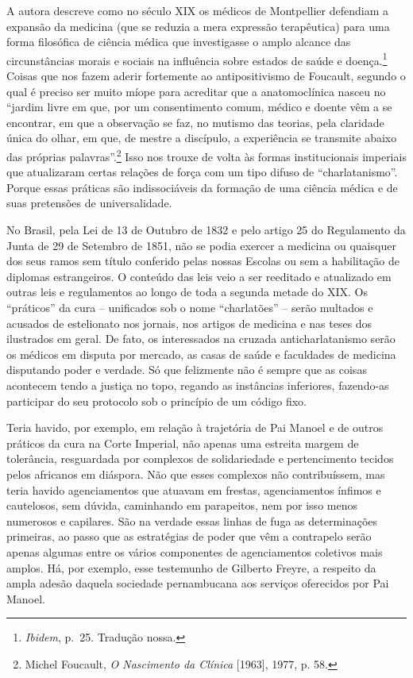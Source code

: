 A autora descreve como no século XIX os médicos de Montpellier defendiam
a expansão da medicina (que se reduzia a mera expressão terapêutica)
para uma forma filosófica de ciência médica que investigasse o amplo
alcance das circunstâncias morais e sociais na influência sobre estados
de saúde e doença.\footnote{\emph{Ibidem}, p.~25. Tradução nossa.}
Coisas que nos fazem aderir fortemente ao antipositivismo de Foucault,
segundo o qual é preciso ser muito míope para acreditar que a
anatomoclínica nasceu no ``jardim livre em que, por um consentimento
comum, médico e doente vêm a se encontrar, em que a observação se faz,
no mutismo das teorias, pela claridade única do olhar, em que, de mestre
a discípulo, a experiência se transmite abaixo das próprias
palavras''.\footnote{Michel Foucault, \emph{O Nascimento da Clínica}
  {[}1963{]}, 1977, p. 58.} Isso nos trouxe de volta às formas
institucionais imperiais que atualizaram certas relações de força com um
tipo difuso de ``charlatanismo''. Porque essas práticas são
indissociáveis da formação de uma ciência médica e de suas pretensões de
universalidade.

No Brasil, pela Lei de 13 de Outubro de 1832 e pelo artigo 25 do
Regulamento da Junta de 29 de Setembro de 1851, não se podia exercer a
medicina ou quaisquer dos seus ramos sem título conferido pelas nossas
Escolas ou sem a habilitação de diplomas estrangeiros. O conteúdo das
leis veio a ser reeditado e atualizado em outras leis e regulamentos ao
longo de toda a segunda metade do XIX. Os ``práticos'' da cura --
unificados sob o nome ``charlatões'' -- serão multados e acusados de
estelionato nos jornais, nos artigos de medicina e nas teses dos
ilustrados em geral. De fato, os interessados na cruzada
anticharlatanismo serão os médicos em disputa por mercado, as casas de
saúde e faculdades de medicina disputando poder e verdade. Só que
felizmente não é sempre que as coisas acontecem tendo a justiça no topo,
regando as instâncias inferiores, fazendo-as participar do seu protocolo
sob o princípio de um código fixo.

Teria havido, por exemplo, em relação à trajetória de Pai Manoel e de
outros práticos da cura na Corte Imperial, não apenas uma estreita
margem de tolerância, resguardada por complexos de solidariedade e
pertencimento tecidos pelos africanos em diáspora. Não que esses
complexos não contribuíssem, mas teria havido agenciamentos que atuavam
em frestas, agenciamentos ínfimos e cautelosos, sem dúvida, caminhando
em parapeitos, nem por isso menos numerosos e capilares. São na verdade
essas linhas de fuga as determinações primeiras, ao passo que as
estratégias de poder que vêm a contrapelo serão apenas algumas entre os
vários componentes de agenciamentos coletivos mais amplos. Há, por
exemplo, esse testemunho de Gilberto Freyre, a respeito da ampla adesão
daquela sociedade pernambucana aos serviços oferecidos por Pai Manoel.

